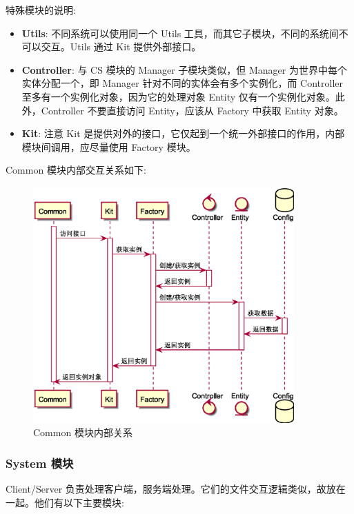 特殊模块的说明:
\begin{itemize}
    \item \textbf{Utils}: 不同系统可以使用同一个 Utils 工具，而其它子模块，不同的系统间不可以交互。Utils 通过 Kit 提供外部接口。
    \item \textbf{Controller}: 与 CS 模块的 Manager 子模块类似，但 Manager 为世界中每个实体分配一个，即 Manager 针对不同的实体会有多个实例化，而 Controller 至多有一个实例化对象，因为它的处理对象 Entity 仅有一个实例化对象。此外，Controller 不要直接访问 Entity，应该从 Factory 中获取 Entity 对象。
    \item \textbf{Kit}: 注意 Kit 是提供对外的接口，它仅起到一个统一外部接口的作用，内部模块间调用，应尽量使用 Factory 模块。
\end{itemize}

Common 模块内部交互关系如下:

\begin{figure}[H]
    \scriptsize
    \centering
    \includegraphics[width=10cm]{images/puml/common.eps} 
    \caption{Common 模块内部关系}
    \label{fig:Common 模块内部关系}
\end{figure}

\subsubsection{System 模块}

Client/Server 负责处理客户端，服务端处理。它们的文件交互逻辑类似，故放在一起。他们有以下主要模块:

